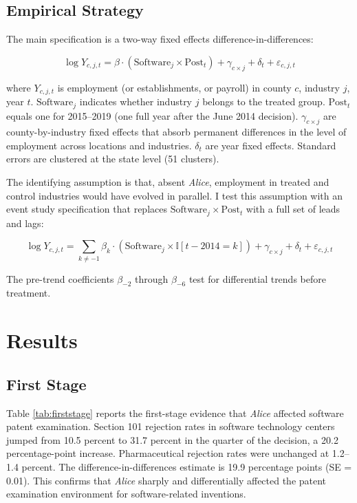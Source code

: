 \documentclass[12pt]{article}
\newcommand{\ind}{\mathbb{I}}
\begin{document}
\subsection{Empirical Strategy}

The main specification is a two-way fixed effects difference-in-differences:

\begin{equation}
\log Y_{c,j,t} = \beta \cdot (\text{Software}_j \times \text{Post}_t) + \gamma_{c \times j} + \delta_t + \varepsilon_{c,j,t}
\label{eq:main}
\end{equation}

\noindent where $Y_{c,j,t}$ is employment (or establishments, or payroll) in county $c$, industry $j$, year $t$. $\text{Software}_j$ indicates whether industry $j$ belongs to the treated group. $\text{Post}_t$ equals one for 2015--2019 (one full year after the June 2014 decision). $\gamma_{c \times j}$ are county-by-industry fixed effects that absorb permanent differences in the level of employment across locations and industries. $\delta_t$ are year fixed effects. Standard errors are clustered at the state level (51 clusters).

The identifying assumption is that, absent \textit{Alice}, employment in treated and control industries would have evolved in parallel. I test this assumption with an event study specification that replaces $\text{Software}_j \times \text{Post}_t$ with a full set of leads and lags:

\begin{equation}
\log Y_{c,j,t} = \sum_{k \neq -1} \beta_k \cdot (\text{Software}_j \times \ind[t - 2014 = k]) + \gamma_{c \times j} + \delta_t + \varepsilon_{c,j,t}
\label{eq:eventstudy}
\end{equation}

\noindent The pre-trend coefficients $\beta_{-2}$ through $\beta_{-6}$ test for differential trends before treatment.


\section{Results}

\subsection{First Stage}

Table \ref{tab:firststage} reports the first-stage evidence that \textit{Alice} affected software patent examination. Section 101 rejection rates in software technology centers jumped from 10.5 percent to 31.7 percent in the quarter of the decision, a 20.2 percentage-point increase. Pharmaceutical rejection rates were unchanged at 1.2--1.4 percent. The difference-in-differences estimate is 19.9 percentage points (SE = 0.01). This confirms that \textit{Alice} sharply and differentially affected the patent examination environment for software-related inventions.
\end{document}
